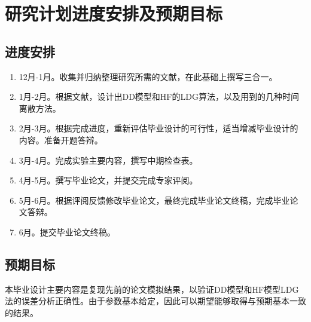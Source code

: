 \section{研究计划进度安排及预期目标}

\subsection{进度安排}
\begin{enumerate}
    \item 12月-1月。收集并归纳整理研究所需的文献，在此基础上撰写三合一。
    \item 1月-2月。根据文献，设计出DD模型和HF的LDG算法，以及用到的几种时间离散方法。
    \item 2月-3月。根据完成进度，重新评估毕业设计的可行性，适当增减毕业设计的内容。准备开题答辩。
    \item 3月-4月。完成实验主要内容，撰写中期检查表。
    \item 4月-5月。撰写毕业论文，并提交完成专家评阅。
    \item 5月-6月。根据评阅反馈修改毕业论文，最终完成毕业论文终稿，完成毕业论文答辩。
    \item 6月。提交毕业论文终稿。
\end{enumerate}
\subsection{预期目标}
本毕业设计主要内容是复现先前的论文模拟结果\cite{liu2016analysis,liu2010error}，以验证DD模型和HF模型LDG法的误差分析正确性。由于参数基本给定，因此可以期望能够取得与预期基本一致的结果。